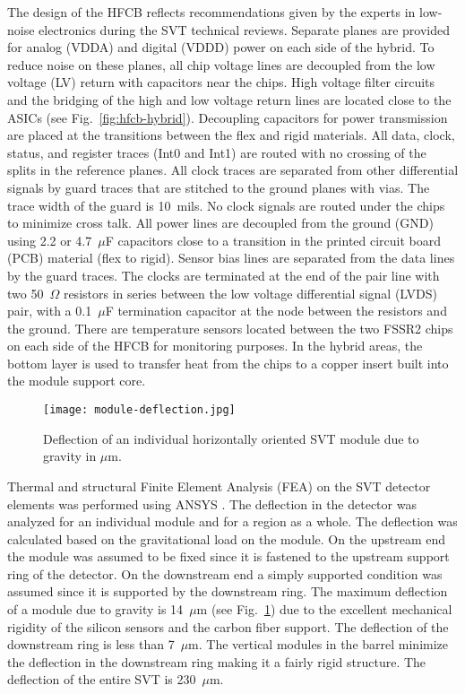 The design of the HFCB reflects recommendations given by the experts in low-noise electronics during the SVT
technical reviews. Separate planes are provided for analog (VDDA) and digital (VDDD) power on each side of the
hybrid. To reduce noise on these planes, all chip voltage lines are decoupled from the low voltage (LV) return with
capacitors near the chips. High voltage filter circuits and the bridging of the high and low voltage return lines are
located close to the ASICs (see Fig.~\ref{fig:hfcb-hybrid}). Decoupling capacitors for power transmission are placed
at the transitions between the flex and rigid materials. All data, clock, status, and register traces (Int0 and Int1)
are routed with no crossing of the splits in the reference planes. All clock traces are separated from other
differential signals by guard traces that are stitched to the ground planes with vias. The trace width of the guard
is 10~mils. No clock signals are routed under the chips to minimize cross talk. All power lines are  decoupled from
the ground (GND) using 2.2 or 4.7~$\mu$F capacitors close to a transition in the printed circuit board (PCB) material
(flex to rigid). Sensor bias lines are separated from the data lines by the guard traces. The clocks are terminated at
the end of the pair line with two 50~$\Omega$ resistors in series between the low voltage differential signal (LVDS)
pair, with a 0.1~$\mu$F termination capacitor at the node between the resistors and the ground. There are
temperature sensors located between the two FSSR2 chips on each side of the HFCB for monitoring purposes. In the
hybrid areas, the bottom layer is used to transfer heat from the chips to a copper insert built into the module support
core. 

\begin{figure}[h] 
\centering 
\texttt{[image: module-deflection.jpg]}
\caption{Deflection of an individual horizontally oriented SVT module due to gravity in $\mu$m.}
\label{fig:module-deflection}
\end{figure}

Thermal and structural Finite Element Analysis (FEA) on the SVT detector elements was performed using ANSYS
\cite{ANSYS}. The deflection in the detector was analyzed for an individual module and for a region as a whole. The
deflection was calculated based on the gravitational load on the module. On the upstream end the module was assumed
to be fixed since it is fastened to the upstream support ring of the detector. On the downstream end a simply
supported condition was assumed since it is supported by the downstream ring. The maximum deflection of a module
due to gravity is 14~$\mu$m (see Fig.~\ref{fig:module-deflection}) due to the excellent mechanical rigidity of the
silicon sensors and the carbon fiber support. The deflection of the downstream ring is less than 7~$\mu$m. The
vertical modules in the barrel minimize the deflection in the downstream ring making it a fairly rigid structure. The
deflection of the entire SVT is 230~$\mu$m. 

